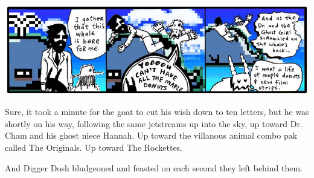 \documentclass[10pt,twoside]{report}
\begin{document}
	\includegraphics[width=1.0\textwidth]{cache/54.png}

Sure, it took a minute for the goat to cut his wish down to ten
letters, but he was shortly on his way, following the same jetstreams
up into the sky, up toward Dr. Cham and his ghost niece Hannah.  Up
toward the villanous animal combo pak called The Originals.  Up toward
The Rockettes.

And Digger Dosh bludgeoned and feasted on each second they left behind
them.
\newpage
\thispagestyle{empty}
\mbox{}
\cleartooddpage
\end{document}
